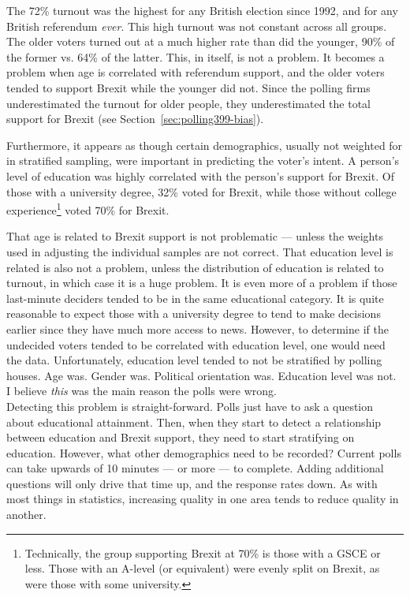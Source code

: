 The 72\% turnout was the highest for any British election since 1992, and for any British referendum \emph{ever}.\cite{erlanger-2016} This high turnout was not constant across all groups. The older voters turned out at a much higher rate than did the younger, 90\% of the former vs. 64\% of the latter.\cite{helm-2016} This, in itself, is not a problem. It becomes a problem when age is correlated with referendum support, and the older voters tended to support Brexit while the younger did not.\cite{moore-2016} Since the polling firms underestimated the turnout for older people, they underestimated the total support for Brexit (see Section~\ref{sec:polling399-bias}).

Furthermore, it appears as though certain demographics, usually not weighted for in stratified sampling, were important in predicting the voter's intent. A person's level of education was highly correlated with the person's support for Brexit. Of those with a university degree, 32\% voted for Brexit, while those without college experience\footnote{Technically, the group supporting Brexit at 70\% is those with a GSCE or less. Those with an A-level (or equivalent) were evenly split on Brexit, as were those with some university.} voted 70\% for Brexit.\cite{moore-2016} 

That age is related to Brexit support is not problematic --- unless the weights used in adjusting the individual samples are not correct. That education level is related is also not a problem, unless the distribution of education is related to turnout, in which case it is a huge problem. It is even more of a problem if those last-minute deciders tended to be in the same educational category. It is quite reasonable to expect those with a university degree to tend to make decisions earlier since they have much more access to news. However, to determine if the undecided voters tended to be correlated with education level, one would need the data. Unfortunately, education level tended to not be stratified by polling houses. Age was. Gender was. Political orientation was. Education level was not.\\

I believe \emph{this} was the main reason the polls were wrong.\\

\noindent
Detecting this problem is straight-forward. Polls just have to ask a question about educational attainment. Then, when they start to detect a relationship between education and Brexit support, they need to start stratifying on education. However, what other demographics need to be recorded? Current polls can take upwards of 10 minutes --- or more --- to complete. Adding additional questions will only drive that time up, and the response rates down. As with most things in statistics, increasing quality in one area tends to reduce quality in another.


















